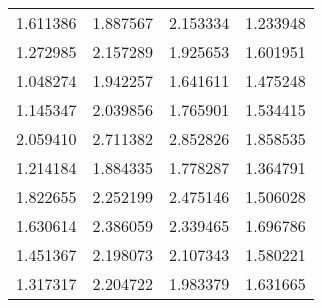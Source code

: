 \begin{longtable}{rrrr}
 1.611386 &        1.887567 &          2.153334 &                1.233948 \\
 1.272985 &        2.157289 &          1.925653 &                1.601951 \\
 1.048274 &        1.942257 &          1.641611 &                1.475248 \\
 1.145347 &        2.039856 &          1.765901 &                1.534415 \\
 2.059410 &        2.711382 &          2.852826 &                1.858535 \\
 1.214184 &        1.884335 &          1.778287 &                1.364791 \\
 1.822655 &        2.252199 &          2.475146 &                1.506028 \\
 1.630614 &        2.386059 &          2.339465 &                1.696786 \\
 1.451367 &        2.198073 &          2.107343 &                1.580221 \\
 1.317317 &        2.204722 &          1.983379 &                1.631665 \\
\end{longtable}
